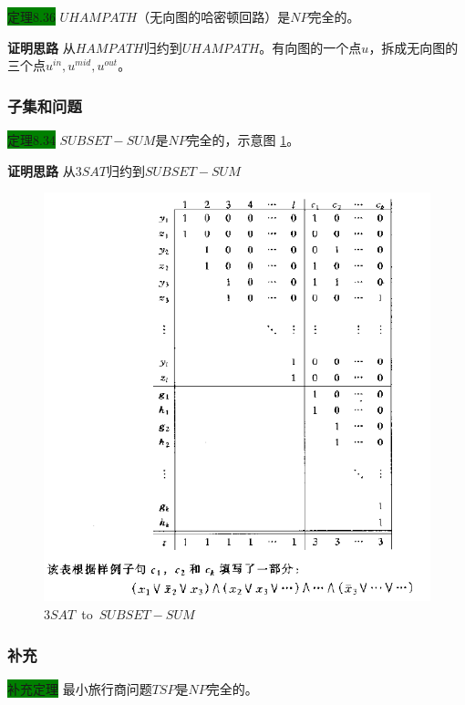\documentclass[a4paper]{article}
\begin{document}
	\colorbox{green}{定理8.36} $UHAMPATH$（无向图的哈密顿回路）是$NP$完全的。
	
	\textbf{证明思路} \quad 从$HAMPATH$归约到$UHAMPATH$。有向图的一个点$u$，拆成无向图的三个点$u^{in},u^{mid},u^{out}$。

\subsubsection{子集和问题}
	
	\colorbox{green}{定理8.34} $SUBSET-SUM$是$NP$完全的，示意图 \ref{F080503}。
	
	\textbf{证明思路} \quad 从$3SAT$归约到$SUBSET-SUM$

	\begin{figure}[htb]
		\centering
		\includegraphics[scale=0.6]{./figure/8.5.3.png}
		\caption{$3SAT$~to~$SUBSET-SUM$}
		\label{F080503}
   \end{figure} 
   
\subsubsection{补充}

	\colorbox{green}{补充定理} 最小旅行商问题$TSP$是$NP$完全的。
	
\end{document}
